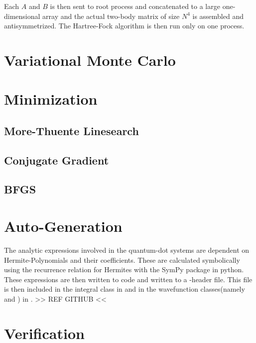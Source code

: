     Each $A$ and $B$ is then sent to root process and concatenated to a large
    one-dimensional array and the actual two-body matrix of size $N^4$ is
    assembled and antisymmetrized. The Hartree-Fock algorithm is then run only
    on one process.

\section{Variational Monte Carlo}
\section{Minimization}
\subsection{More-Thuente Linesearch}
\subsection{Conjugate Gradient}
\subsection{BFGS}
\section{Auto-Generation\label{sec:auto_generation}}
    The analytic expressions involved in the quantum-dot systems are dependent
    on Hermite-Polynomials and their coefficients. These are calculated
    symbolically using the recurrence relation for Hermites with the SymPy
    package in python. These expressions are then written to \CC code and
    written to a \CC-header file. This file is then included in the integral
    class in  and in the wavefunction
    classes(namely  and ) in
    . >> REF GITHUB <<
\section{Verification\label{sec:verification}}

